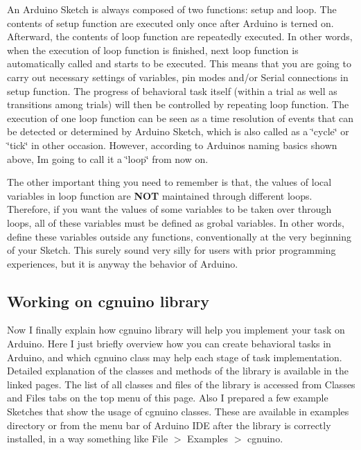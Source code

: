 An Arduino Sketch is always composed of two functions\+: {\ttfamily setup} and {\ttfamily loop}. The contents of {\ttfamily setup} function are executed only once after Arduino is terned on. Afterward, the contents of {\ttfamily loop} function are repeatedly executed. In other words, when the execution of {\ttfamily loop} function is finished, next {\ttfamily loop} function is automatically called and starts to be executed. This means that you are going to carry out necessary settings of variables, pin modes and/or {\ttfamily Serial} connections in {\ttfamily setup} function. The progress of behavioral task itself (within a trial as well as transitions among trials) will then be controlled by repeating {\ttfamily loop} function. The execution of one {\ttfamily loop} function can be seen as a time resolution of events that can be detected or determined by Arduino Sketch, which is also called as a \char`\"{}cycle\char`\"{} or \char`\"{}tick\char`\"{} in other occasion. However, according to Arduino\textquotesingle{}s naming basics shown above, I\textquotesingle{}m going to call it a \char`\"{}loop\char`\"{} from now on.

The other important thing you need to remember is that, the values of local variables in {\ttfamily loop} function are {\bfseries N\+OT} maintained through different loops. Therefore, if you want the values of some variables to be taken over through loops, all of these variables must be defined as grobal variables. In other words, define these variables outside any functions, conventionally at the very beginning of your Sketch. This surely sound very silly for users with prior programming experiences, but it is anyway the behavior of Arduino.\hypertarget{index_s2ss2}{}\subsection{Working on cgnuino library}\label{index_s2ss2}
Now I finally explain how cgnuino library will help you implement your task on Arduino. Here I just briefly overview how you can create behavioral tasks in Arduino, and which cgnuino class may help each stage of task implementation. Detailed explanation of the classes and methods of the library is available in the linked pages. The list of all classes and files of the library is accessed from Classes and Files tabs on the top menu of this page. Also I prepared a few example Sketches that show the usage of cgnuino classes. These are available in {\ttfamily examples} directory or from the menu bar of Arduino I\+DE after the library is correctly installed, in a way something like File $>$ Examples $>$ cgnuino.

